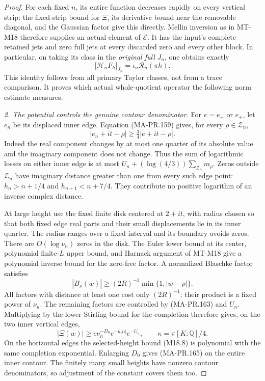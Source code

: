 \begin{proof}
For each fixed \(n\), its entire function decreases
rapidly on every vertical strip: the fixed-strip
bound for \(\Xi\), its derivative bound near the
removable diagonal, and the Gaussian factor give
this directly.  Mellin inversion as in MT-M18
therefore supplies an actual element of \(\mathcal E\).
It has the input's complete retained jets and zero
full jets at every discarded zero and every other
block.  In particular, on taking its class in the
\emph{original full} \(J_n\), one obtains exactly
\[
 \bigl[\mathcal H_nF_h\bigr]_{J_n}
                 =\iota_n\mathscr R_n(\pi h).
 \tag{MA-PR.162}
\]
This identity follows from all primary Taylor classes,
not from a trace comparison.  It proves which actual
whole-quotient operator the following norm estimate
measures.

\emph{2. The potential controls the genuine contour denominator.}
For \(e=e_-\) or \(e_+\), let \(e_n\) be its displaced
inner edge.  Equation (MA-PR.159) gives, for every
\(\rho\in\mathcal Z_n\),
\[
 |e_n+it-\rho|\ge\tfrac34|e+it-\rho|.
 \tag{MA-PR.163}
\]
Indeed the real component changes by at most one
quarter of its absolute value and the imaginary
component does not change.  Thus the sum of
logarithmic losses on either inner edge is at most
\(U_n+(\log(4/3))\sum_{\mathcal Z_n}m_\rho\).
Zeros outside \(\mathcal Z_n\) have imaginary
distance greater than one from every such edge
point: \(h_n>n+1/4\) and \(h_{n+1}<n+7/4\).
They contribute no positive logarithm of an inverse
complex distance.

At large height use the fixed finite disk centered
at \(2+it\), with radius chosen so that both fixed
edge real parts and their small displacements lie
in its inner quarter.  The radius ranges over a
fixed interval and its boundary avoids zeros.
There are \(O(\log\nu_n)\) zeros in the disk.
The Euler lower bound at its center, polynomial
finite-\(L\) upper bound, and Harnack argument of
MT-M18 give a polynomial inverse bound for the
zero-free factor.  A normalized Blaschke factor
satisfies
\[
 |B_\rho(w)|\ge (2R)^{-1}\min\{1,|w-\rho|\}.
 \tag{MA-PR.164}
\]
All factors with distance at least one cost only
\((2R)^{-1}\); their product is a fixed power of
\(\nu_n\).  The remaining factors are controlled
by (MA-PR.163) and \(U_n\).
Multiplying by the lower Stirling bound for the
completion therefore gives, on the two inner
vertical edges,
\[
 |\Xi(w)|\ge c\nu_n^{-D_0}
                         e^{-\kappa|n|}e^{-U_n},
 \qquad \kappa=\pi[K:\mathbb Q]/4.
 \tag{MA-PR.165}
\]
On the horizontal edges the selected-height
bound (M18.8) is polynomial with the same
completion exponential.  Enlarging \(D_0\)
gives (MA-PR.165) on the entire inner contour.
The finitely many small heights have nonzero
contour denominators, so adjustment of the
constant covers them too.


\end{proof}
